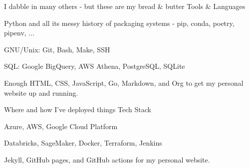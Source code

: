 
\begin{cventries}
  \cventry
    {I dabble in many others - but these are my bread \& butter}
    {Tools \& Languages}
    {}
    {}
    {
      \begin{cvitems}
        \item {Python and all its messy history of packaging systems - pip, conda, poetry, pipenv, ...}
        \item {GNU/Unix: Git, Bash, Make, SSH}
	\item {SQL: Google BigQuery, AWS Athena, PostgreSQL, SQLite}\
        \item {
          Enough HTML, CSS, JavaScript, Go, Markdown, and Org to get my personal
          website up and running.
        }
      \end{cvitems}
    }

  \cventry
    {Where and how I've deployed things}
    {Tech Stack}
    {}
    {}
    {
      \begin{cvitems}
        \item {Azure, AWS, Google Cloud Platform}
        \item {Databricks, SageMaker, Docker, Terraform, Jenkins}
        \item {Jekyll, GitHub pages, and GitHub actions for my personal website.}
      \end{cvitems}
    }

\end{cventries}
